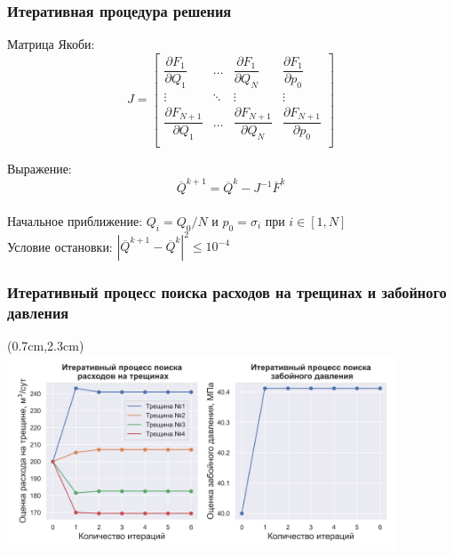 \documentclass{beamer}
\begin{document}
\begin{frame}
\frametitle{Итеративная процедура решения}
Матрица Якоби:
$$J = \begin{bmatrix}
	\dfrac{\partial F_1}{\partial Q_1} & \dots & \dfrac{\partial F_1}{\partial Q_N} & \dfrac{\partial F_1}{\partial p_0} \\
	\vdots & \ddots & \vdots & \vdots \\
	\dfrac{\partial F_{N+1}}{\partial Q_1} & \dots & \dfrac{\partial F_{N+1}}{\partial Q_N} & \dfrac{\partial F_{N+1}}{\partial p_0} \\
	\end{bmatrix}
$$

Выражение:
$$\overline{Q}^{k+1}=\overline{Q}^k-J^{-1}\overline{F}^k$$
\ \\

Начальное приближение:
$Q_i=Q_0/N\text{ и }p_0=\sigma_i\text{ при } i\in\left[1,N\right]$
\ \\

Условие остановки:
$\left|\overline{Q}^{k+1}-\overline{Q}^k\right|^2\leqslant10^{-4}$

\end{frame}


\begin{frame}
\frametitle{Итеративный процесс поиска расходов на трещинах и забойного давления}

\begin{textblock*}{11.6cm}(0.7cm,2.3cm)
\includegraphics[width=11.6cm]{flows_distribution_between_fractures_1.jpg}
\end{textblock*}

\end{frame}
\end{document}
